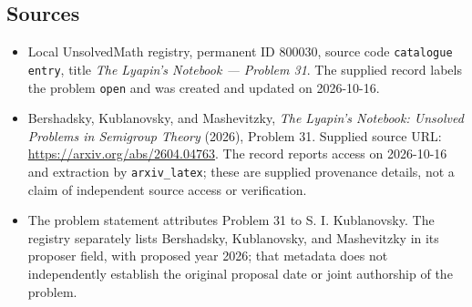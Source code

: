 \documentclass[11pt]{article}
\begin{document}
\subsection{Sources}
\begin{itemize}
\item Local UnsolvedMath registry, permanent ID \(800030\), source code \texttt{catalogue entry}, title \emph{The Lyapin's Notebook --- Problem 31}. The supplied record labels the problem \texttt{open} and was created and updated on 2026-10-16.
\item Bershadsky, Kublanovsky, and Mashevitzky, \emph{The Lyapin's Notebook: Unsolved Problems in Semigroup Theory} (2026), Problem 31. Supplied source URL: \url{https://arxiv.org/abs/2604.04763}. The record reports access on 2026-10-16 and extraction by \texttt{arxiv\_latex}; these are supplied provenance details, not a claim of independent source access or verification.
\item The problem statement attributes Problem 31 to S. I. Kublanovsky. The registry separately lists Bershadsky, Kublanovsky, and Mashevitzky in its proposer field, with proposed year 2026; that metadata does not independently establish the original proposal date or joint authorship of the problem.
\end{itemize}
\end{document}
